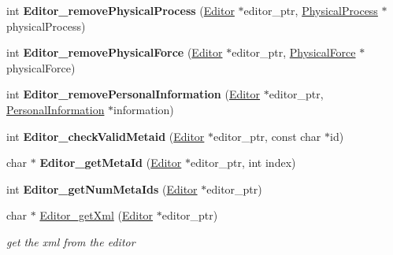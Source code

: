 \begin{DoxyCompactItemize}
\item 
\mbox{\label{namespaceomexmeta_a8b8f9382a445fca997eb8db8963cce4e}} 
int {\bfseries Editor\+\_\+remove\+Physical\+Process} (\hyperlink{classomexmeta_1_1Editor}{Editor} $\ast$editor\+\_\+ptr, \hyperlink{classomexmeta_1_1PhysicalProcess}{Physical\+Process} $\ast$physical\+Process)
\item 
\mbox{\label{namespaceomexmeta_a5d9f7c0c294472359ce3d70db5cb1035}} 
int {\bfseries Editor\+\_\+remove\+Physical\+Force} (\hyperlink{classomexmeta_1_1Editor}{Editor} $\ast$editor\+\_\+ptr, \hyperlink{classomexmeta_1_1PhysicalForce}{Physical\+Force} $\ast$physical\+Force)
\item 
\mbox{\label{namespaceomexmeta_aac121eb946b9380ca162061ab725dad0}} 
int {\bfseries Editor\+\_\+remove\+Personal\+Information} (\hyperlink{classomexmeta_1_1Editor}{Editor} $\ast$editor\+\_\+ptr, \hyperlink{classomexmeta_1_1PersonalInformation}{Personal\+Information} $\ast$information)
\item 
\mbox{\label{namespaceomexmeta_a8127880005ca59e64ae81fe57cd824fa}} 
int {\bfseries Editor\+\_\+check\+Valid\+Metaid} (\hyperlink{classomexmeta_1_1Editor}{Editor} $\ast$editor\+\_\+ptr, const char $\ast$id)
\item 
\mbox{\label{namespaceomexmeta_aec2f4973721ccc82ae54980e951f7565}} 
char $\ast$ {\bfseries Editor\+\_\+get\+Meta\+Id} (\hyperlink{classomexmeta_1_1Editor}{Editor} $\ast$editor\+\_\+ptr, int index)
\item 
\mbox{\label{namespaceomexmeta_a6a97e52deef1b7abde9b4491de14f68b}} 
int {\bfseries Editor\+\_\+get\+Num\+Meta\+Ids} (\hyperlink{classomexmeta_1_1Editor}{Editor} $\ast$editor\+\_\+ptr)
\item 
char $\ast$ \hyperlink{namespaceomexmeta_a96e4c18dc172184811a0bd6468d00b35}{Editor\+\_\+get\+Xml} (\hyperlink{classomexmeta_1_1Editor}{Editor} $\ast$editor\+\_\+ptr)
\begin{DoxyCompactList}\small\item\em get the xml from the editor \end{DoxyCompactList}\item 
\mbox{\label{namespaceomexmeta_ade855a67befd16925ed583d228606d43}} 

\end{DoxyCompactItemize}
